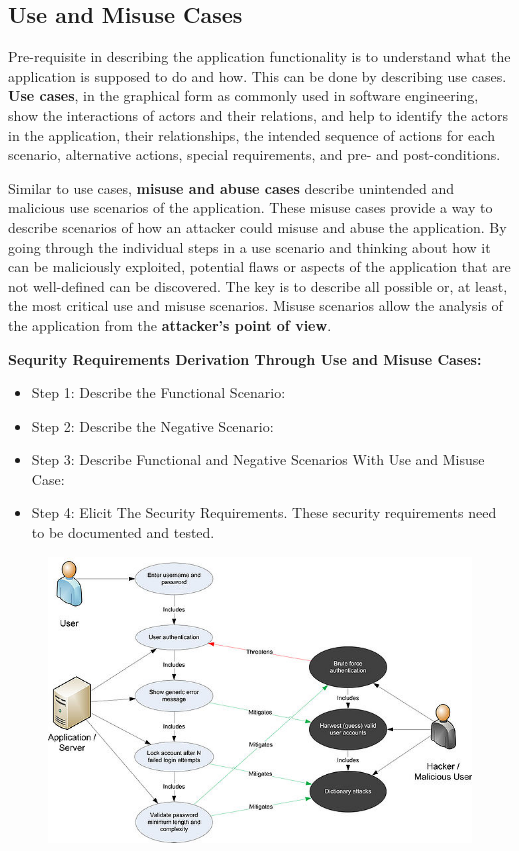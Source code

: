 		\subsection{Use and Misuse Cases}
			Pre-requisite in describing the application functionality is to understand what the application 
			is supposed to do and how. This can be done by describing use cases. {\bf Use cases}, in the 
			graphical form as commonly used in software engineering, show the interactions of actors and 
			their relations, and help to identify the actors in the application, their relationships, the
			intended sequence of actions for each scenario, alternative actions, special requirements, 
			and pre- and post-conditions.

			Similar to use cases, {\bf misuse and abuse cases} describe unintended and malicious use scenarios 
			of the application. These misuse cases provide a way to describe scenarios of how an attacker 
			could misuse and abuse the application. By going through the individual steps in a use scenario 
			and thinking about how it can be maliciously exploited, potential flaws or aspects of the application 
			that are not well-defined can be discovered. The key is to describe all possible or, at least, the
			most critical use and misuse scenarios. Misuse scenarios allow the analysis of the application from 
			the {\bf attacker's point of view}.

			\clearpage
			{\bf Sequrity Requirements Derivation Through Use and Misuse Cases:}
				\begin{itemize}
					\item Step 1: Describe the Functional Scenario: 
					\item Step 2: Describe the Negative Scenario: 
					\item Step 3: Describe Functional and Negative Scenarios With Use and Misuse Case:
					\item Step 4: Elicit The Security Requirements. These security requirements need to be 
					documented and tested.

				\end{itemize}

			\begin{figure}[H]
				\includegraphics[width=\textwidth]{pics/useAndMisuse.jpg}
			\end{figure}
	\clearpage
